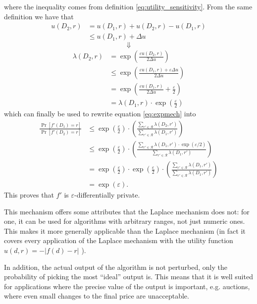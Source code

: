 \documentclass[12pt]{article}
\newcommand{\fancy}{\mathcal}
\renewcommand{\epsilon}{\varepsilon}
\begin{document}
where the inequality comes from definition \ref{eq:utility_sensitivity}. From the same definition we have that
\begin{align*}
    u(D_2,r) &= u(D_1,r) + u(D_2,r) - u(D_1,r) \\
        &\leq u(D_1,r) + \Delta u
\end{align*}
$$\Downarrow$$
\begin{align*}
    \lambda(D_2,r) &= \exp\left( \frac{\epsilon u(D_2,r)}{2\Delta u} \right) \\
        &\leq \exp\left( \frac{\epsilon u(D_1,r) + \epsilon\Delta u}{2\Delta u} \right) \\
        &= \exp\left( \frac{\epsilon u(D_1,r)}{2\Delta u} + \frac{\epsilon}{2} \right) \\
        &= \lambda(D_1,r) \cdot \exp \left( \frac{\epsilon}{2} \right)
\end{align*}
which can finally be used to rewrite equation \ref{eq:expmech} into
\begin{align*}
    \frac{\Pr[f'(D_1) = r]}{\Pr[f'(D_2) = r]} &\leq \exp \left( \frac{\epsilon}{2} \right) \cdot \left( \frac{\sum_{r'\in\fancy{R}} \lambda(D_2,r')}{\sum_{r'\in\fancy{R}} \lambda(D_1,r')} \right) \\
        &\leq \exp\left( \frac{\epsilon}{2} \right) \cdot \left( \frac{\sum_{r'\in\fancy{R}} \lambda(D_1,r')\cdot \exp(\epsilon/2)}{\sum_{r'\in\fancy{R}} \lambda(D_1,r')} \right) \\
        &= \exp\left( \frac{\epsilon}{2} \right) \cdot \exp\left( \frac{\epsilon}{2} \right) \cdot \left( \frac{\sum_{r'\in\fancy{R}} \lambda(D_1,r')}{\sum_{r'\in\fancy{R}} \lambda(D_1,r')} \right) \\
        &= \exp(\epsilon).
\end{align*}
This proves that $f'$ is $\epsilon$-differentially private. \bigskip

This mechanism offers some attributes that the Laplace mechanism does not: for one, it can be used for algorithms with arbitrary ranges, not just numeric ones. This makes it more generally applicable than the Laplace mechanism (in fact it covers every application of the Laplace mechanism with the utility function $u(d,r)=-|f(d)-r|$ \cite{sherry_exponentialmech}).

In addition, the actual output of the algorithm is not perturbed, only the probability of picking the most ``ideal'' output is. This means that it is well suited for applications where the precise value of the output is important, e.g. auctions, where even small changes to the final price are unacceptable.
\end{document}
